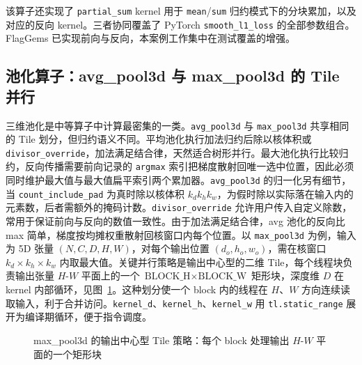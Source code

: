 该算子还实现了 \texttt{partial\_sum} kernel 用于 \texttt{mean}/\texttt{sum} 归约模式下的分块累加，以及对应的反向 kernel。三者协同覆盖了 PyTorch \texttt{smooth\_l1\_loss} 的全部参数组合。FlagGems 已实现前向与反向，本案例工作集中在测试覆盖的增强。

\subsection{池化算子：avg\_pool3d 与 max\_pool3d 的 Tile 并行}
三维池化是中等算子中计算最密集的一类。\texttt{avg\_pool3d} 与 \texttt{max\_pool3d} 共享相同的 Tile 划分，但归约语义不同。平均池化执行加法归约后除以核体积或 \texttt{divisor\_override}，加法满足结合律，天然适合树形并行。最大池化执行比较归约，反向传播需要前向记录的 \texttt{argmax} 索引把梯度散射回唯一选中位置，因此必须同时维护最大值与最大值扁平索引两个累加器。\texttt{avg\_pool3d} 的归一化另有细节，当 \texttt{count\_include\_pad} 为真时除以核体积 $k_d k_h k_w$，为假时除以实际落在输入内的元素数，后者需额外的掩码计数。\texttt{divisor\_override} 允许用户传入自定义除数，常用于保证前向与反向的数值一致性。由于加法满足结合律，avg 池化的反向比 max 简单，梯度按均摊权重散射回核窗口内每个位置。以 \texttt{max\_pool3d} 为例，输入为 5D 张量 $(N, C, D, H, W)$，对每个输出位置 $(d_o, h_o, w_o)$，需在核窗口 $k_d \times k_h \times k_w$ 内取最大值。关键并行策略是输出中心型的二维 Tile，每个线程块负责输出张量 $H$-$W$ 平面上的一个 $\text{BLOCK\_H} \times \text{BLOCK\_W}$ 矩形块，深度维 $D$ 在 kernel 内部循环，见图~\ref{fig:pool-tile}。这种划分使一个 block 内的线程在 $H$、$W$ 方向连续读取输入，利于合并访问。\texttt{kernel\_d}、\texttt{kernel\_h}、\texttt{kernel\_w} 用 \texttt{tl.static\_range} 展开为编译期循环，便于指令调度。

\begin{figure}[!htbp]
\centering
{}
\caption{max\_pool3d 的输出中心型 Tile 策略：每个 block 处理输出 $H$-$W$ 平面的一个矩形块}
\label{fig:pool-tile}
\end{figure}

